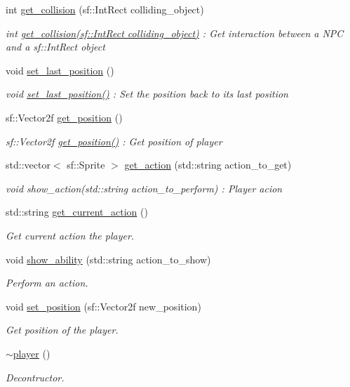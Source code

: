 \begin{DoxyCompactItemize}
int \hyperlink{classplayer_aa405bc495c5a6bced7740352abd4249f}{get\+\_\+collision} (sf\+::\+Int\+Rect colliding\+\_\+object)
\begin{DoxyCompactList}\small\item\em int \hyperlink{classplayer_aa405bc495c5a6bced7740352abd4249f}{get\+\_\+collision(sf\+::\+Int\+Rect colliding\+\_\+object)} \+: Get interaction between a N\+PC and a sf\+::\+Int\+Rect object \end{DoxyCompactList}\item 
void \hyperlink{classplayer_a3bf8cc80800146684a3dbf28c0c4a83c}{set\+\_\+last\+\_\+position} ()
\begin{DoxyCompactList}\small\item\em void \hyperlink{classplayer_a3bf8cc80800146684a3dbf28c0c4a83c}{set\+\_\+last\+\_\+position()} \+: Set the position back to its last position \end{DoxyCompactList}\item 
sf\+::\+Vector2f \hyperlink{classplayer_a78d420774623e89cd896d3cb1d265b17}{get\+\_\+position} ()
\begin{DoxyCompactList}\small\item\em sf\+::\+Vector2f \hyperlink{classplayer_a78d420774623e89cd896d3cb1d265b17}{get\+\_\+position()} \+: Get position of player \end{DoxyCompactList}\item 
std\+::vector$<$ sf\+::\+Sprite $>$ \hyperlink{classplayer_a676129193d589a975d7a86429a37b1b7}{get\+\_\+action} (std\+::string action\+\_\+to\+\_\+get)
\begin{DoxyCompactList}\small\item\em void show\+\_\+action(std\+::string action\+\_\+to\+\_\+perform) \+: Player acion \end{DoxyCompactList}\item 
std\+::string \hyperlink{classplayer_afc7732284851b7f0d90b66a5d25931e2}{get\+\_\+current\+\_\+action} ()
\begin{DoxyCompactList}\small\item\em Get current action the player. \end{DoxyCompactList}\item 
void \hyperlink{classplayer_a4659a0677d5b19b0ae27737dfaa0176e}{show\+\_\+ability} (std\+::string action\+\_\+to\+\_\+show)
\begin{DoxyCompactList}\small\item\em Perform an action. \end{DoxyCompactList}\item 
void \hyperlink{classplayer_a17ee5122ab15251afb54b4cdd42060e6}{set\+\_\+position} (sf\+::\+Vector2f new\+\_\+position)
\begin{DoxyCompactList}\small\item\em Get position of the player. \end{DoxyCompactList}\item 
\hyperlink{classplayer_aab5d2e47b80e0481f09ca0df8b823057}{$\sim$player} ()
\begin{DoxyCompactList}\small\item\em Decontructor. \end{DoxyCompactList}\end{DoxyCompactItemize}
